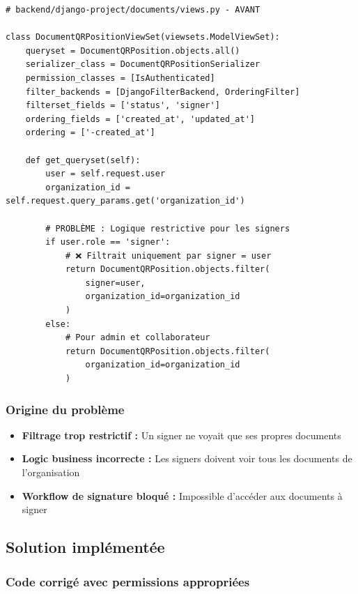 \documentclass[12pt,a4paper]{article}
\begin{document}
\begin{lstlisting}[style=python, caption={Code original avec problème de permissions}]
# backend/django-project/documents/views.py - AVANT

class DocumentQRPositionViewSet(viewsets.ModelViewSet):
    queryset = DocumentQRPosition.objects.all()
    serializer_class = DocumentQRPositionSerializer
    permission_classes = [IsAuthenticated]
    filter_backends = [DjangoFilterBackend, OrderingFilter]
    filterset_fields = ['status', 'signer']
    ordering_fields = ['created_at', 'updated_at']
    ordering = ['-created_at']

    def get_queryset(self):
        user = self.request.user
        organization_id = self.request.query_params.get('organization_id')
        
        # PROBLÈME : Logique restrictive pour les signers
        if user.role == 'signer':
            # ❌ Filtrait uniquement par signer = user
            return DocumentQRPosition.objects.filter(
                signer=user,
                organization_id=organization_id
            )
        else:
            # Pour admin et collaborateur
            return DocumentQRPosition.objects.filter(
                organization_id=organization_id
            )
\end{lstlisting}

\subsubsection{Origine du problème}
\begin{itemize}[leftmargin=*]
    \item \textbf{Filtrage trop restrictif :} Un signer ne voyait que ses propres documents
    \item \textbf{Logic business incorrecte :} Les signers doivent voir tous les documents de l'organisation
    \item \textbf{Workflow de signature bloqué :} Impossible d'accéder aux documents à signer
\end{itemize}

\subsection{Solution implémentée}

\subsubsection{Code corrigé avec permissions appropriées}
\end{document}
